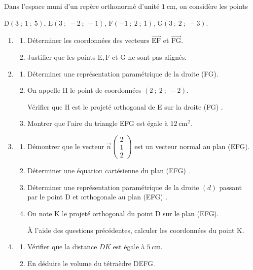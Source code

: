 \medskip

Dans l'espace muni d'un repère orthonormé d'unité $1 \mathrm{~cm}$, on considère les points

\begin{center}$\mathrm{D}(3~;~1~;~5)$, \qquad 
$\mathrm{E}(3~;~-2~;~-1)$, \qquad 
$\mathrm{F}(-1~;~2~;~1)$, \qquad 
$\mathrm{G}(3~;~2~;~-3)$.\end{center}

\smallskip

\begin{enumerate}
\item 
	\begin{enumerate}
		\item Déterminer les coordonnées des vecteurs $\overrightarrow{\text{EF}}$ et $\overrightarrow{\text{FG}}$.
		\item Justifier que les points $\mathrm{E}, \mathrm{F}$ et $\mathrm{G}$ ne sont pas alignés.
	\end{enumerate}
\item 
	\begin{enumerate}
		\item Déterminer une représentation paramétrique de la droite (FG).
		\item On appelle $\mathrm{H}$ le point de coordonnées $(2~;~2~;~-2)$.

Vérifier que $\mathrm{H}$ est le projeté orthogonal de E sur la droite (FG) .
		\item Montrer que l'aire du triangle EFG est égale à $12\mathrm{~cm}^{2}$.
	\end{enumerate}
\item 
	\begin{enumerate}
		\item Démontrer que le vecteur $\vec{n}\begin{pmatrix}2 \\ 1 \\ 2\end{pmatrix}$ est un vecteur normal au plan (EFG).
		\item Déterminer une équation cartésienne du plan (EFG) .
		\item Déterminer une représentation paramétrique de la droite $(d)$ passant par le point $\mathrm{D}$ et orthogonale au plan (EFG) .
		\item On note K le projeté orthogonal du point D sur le plan (EFG).

À l'aide des questions précédentes, calculer les coordonnées du point $\mathrm{K}$.
	\end{enumerate}
\item 
	\begin{enumerate}
		\item Vérifier que la distance $D K$ est égale à $5 \mathrm{~cm}$.
		\item En déduire le volume du tétraèdre DEFG.
	\end{enumerate}
\end{enumerate}

\bigskip
